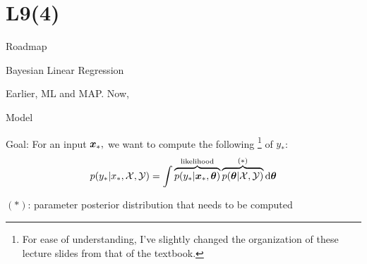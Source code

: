 \documentclass[handout,fleqn,aspectratio=169]{beamer}
\begin{document}
\section{L9(4)}
\begin{frame}{Roadmap}

\plitemsep 0.1in

\bce[(1)] 

\item  {}
\item  {} 
\item  {} 
\item  {} 
\item  {}

\ece
\end{frame}


\begin{frame}{Bayesian Linear Regression}


\plitemsep 0.05in


\bci 

\item Earlier, ML and MAP. Now,  \hfill {}

\item Model 
{
\vspace{-0.2cm}
}
{
\vspace{-0.2cm}
}
\item Goal: For an input $\bm{x}_*,$ we want to compute the following \footnote{ For ease of understanding, I've slightly changed the organization of these lecture slides from that of the textbook.} of $y_*$:
\vspace{-0.3cm}
$$
\displaystyle
 p(y_* | x_*, \mathcal X,\mathcal Y) = \int \overbrace{p(y_* | \bm{x}_*, \bm{\theta})}^{\text{likelihood}} 
 \overbrace{p(\bm{\theta} | \mathcal X,\mathcal Y)}^{(*)}\text{d}\bm{\theta}
$$
\vspace{-0.3cm}
\bci
\item $(*)$: parameter posterior distribution that needs to be computed
\eci
\eci

\end{frame}
\end{document}
